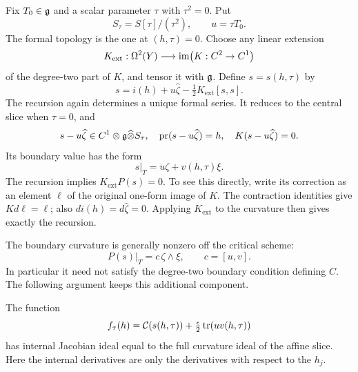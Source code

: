 Fix $T_0\in\mathfrak{g}$ and a scalar parameter $\tau$ with $\tau^2=0$.  Put
\[
 S_\tau=S[\tau]/(\tau^2),\qquad u=\tau T_0.
\]
The formal topology is the one at $(h,\tau)=0$.  Choose any linear
extension
\[
 K_{\mathrm{ext}}:\Omega^2(Y)\longrightarrow
       \operatorname{im}\bigl(K:C^2\to C^1\bigr)
\]
of the degree-two part of $K$, and tensor it with $\mathfrak{g}$.  Define
$s=s(h,\tau)$ by
\begin{equation}
\label{eq:edge-affine-recursion}
 s=i(h)+u\widehat\zeta-\tfrac12K_{\mathrm{ext}}[s,s].
\end{equation}
The recursion again determines a unique formal series.  It reduces to
the central slice when $\tau=0$, and
\[
 s-u\widehat\zeta\in C^1\otimes\mathfrak{g}\widehat\otimes S_\tau,
 \quad \operatorname{pr}(s-u\widehat\zeta)=h,
 \quad K(s-u\widehat\zeta)=0.
\]
Its boundary value has the form
\[
 s|_T=u\zeta+v(h,\tau)\xi.
\]
The recursion implies $K_{\mathrm{ext}}P(s)=0$.  To see this directly,
write its correction as an element $\ell$ of the original one-form
image of $K$.  The contraction identities give $Kd\ell=\ell$;
also $di(h)=d\widehat\zeta=0$.  Applying $K_{\mathrm{ext}}$ to the
curvature then gives exactly the recursion.

The boundary curvature is generally nonzero off the critical scheme:
\begin{equation}
\label{eq:edge-boundary-curvature}
 P(s)|_T=c\,\zeta\wedge\xi,\qquad c=[u,v].
\end{equation}
In particular it need not satisfy the degree-two boundary condition
defining $C$.  The following argument keeps this additional component.

\begin{lemma}
\label{lem:edge-affine-ideal}
The function
\begin{equation}
\label{eq:edge-adjusted-potential}
 f_\tau(h)=\mathcal C(s(h,\tau))
                   +\tfrac{\epsilon}{2}\operatorname{tr}(u v(h,\tau))
\end{equation}
has internal Jacobian ideal equal to the full curvature ideal of the
affine slice.  Here the internal derivatives are only the derivatives
with respect to the $h_j$.
\end{lemma}

